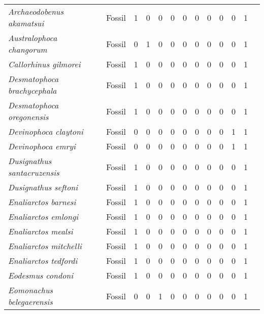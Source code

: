 \begin{longtable}{llccccccccccp{}}
\textit{Archaeodobenus akamatsui} &
Fossil &
1 &
0 &
0 &
0 &
0 &
0 &
0 &
0 &
0 &
1 &
\\

\textit{Australophoca changorum} &
Fossil &
0 &
1 &
0 &
0 &
0 &
0 &
0 &
0 &
0 &
1 &
\\

\textit{Callorhinus gilmorei} &
Fossil &
1 &
0 &
0 &
0 &
0 &
0 &
0 &
0 &
0 &
1 &
\\

\textit{Desmatophoca brachycephala} &
Fossil &
1 &
0 &
0 &
0 &
0 &
0 &
0 &
0 &
0 &
1 &
\\

\textit{Desmatophoca oregonensis} &
Fossil &
1 &
0 &
0 &
0 &
0 &
0 &
0 &
0 &
0 &
1 &
\\

\textit{Devinophoca claytoni} &
Fossil &
0 &
0 &
0 &
0 &
0 &
0 &
0 &
0 &
1 &
1 &
\\

\textit{Devinophoca emryi} &
Fossil &
0 &
0 &
0 &
0 &
0 &
0 &
0 &
0 &
1 &
1 &
\\

\textit{Dusignathus santacruzensis} &
Fossil &
1 &
0 &
0 &
0 &
0 &
0 &
0 &
0 &
0 &
1 &
\\

\textit{Dusignathus seftoni} &
Fossil &
1 &
0 &
0 &
0 &
0 &
0 &
0 &
0 &
0 &
1 &
\\

\textit{Enaliarctos barnesi} &
Fossil &
1 &
0 &
0 &
0 &
0 &
0 &
0 &
0 &
0 &
1 &
\\

\textit{Enaliarctos emlongi} &
Fossil &
1 &
0 &
0 &
0 &
0 &
0 &
0 &
0 &
0 &
1 &
\\

\textit{Enaliarctos mealsi} &
Fossil &
1 &
0 &
0 &
0 &
0 &
0 &
0 &
0 &
0 &
1 &
\\

\textit{Enaliarctos mitchelli} &
Fossil &
1 &
0 &
0 &
0 &
0 &
0 &
0 &
0 &
0 &
1 &
\\

\textit{Enaliarctos tedfordi} &
Fossil &
1 &
0 &
0 &
0 &
0 &
0 &
0 &
0 &
0 &
1 &
\\

\textit{Eodesmus condoni} &
Fossil &
1 &
0 &
0 &
0 &
0 &
0 &
0 &
0 &
0 &
1 &
\\

\textit{Eomonachus belegaerensis} &
Fossil &
0 &
0 &
1 &
0 &
0 &
0 &
0 &
0 &
0 &
1 &
\\


\end{longtable}
